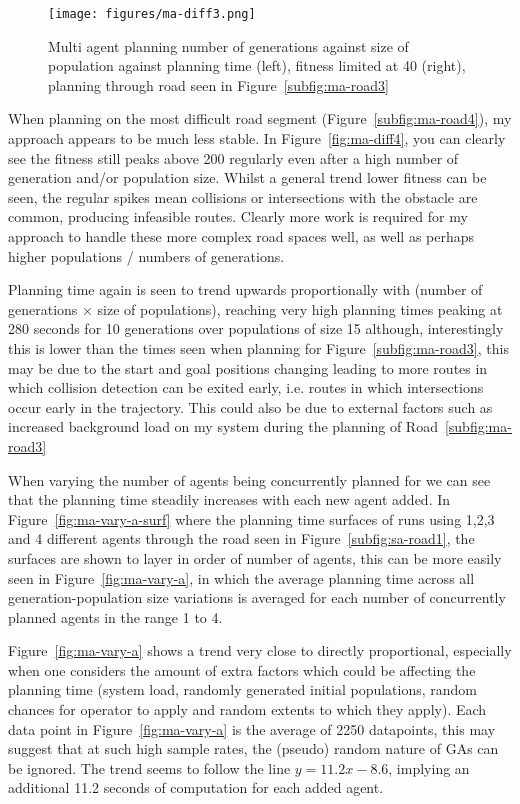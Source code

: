 \begin{figure}[ht]
  \centering
  \texttt{[image: figures/ma-diff3.png]}
  \caption{\label{fig:ma-diff3-lim40} Multi agent planning number of generations against size of population against planning time (left), fitness limited at 40 (right), planning through road seen in Figure~\ref{subfig:ma-road3}}
\end{figure}


When planning on the most difficult road segment (Figure~\ref{subfig:ma-road4}), my approach appears to be much less stable. In Figure~\ref{fig:ma-diff4}, you can clearly see the fitness still peaks above 200 regularly even after a high number of generation and/or population size. Whilst a general trend lower fitness can be seen, the regular spikes mean collisions or intersections with the obstacle are common, producing infeasible routes. Clearly more work is required for my approach to handle these more complex road spaces well, as well as perhaps higher populations / numbers of generations.

Planning time again is seen to trend upwards proportionally with (number of generations $\times$ size of populations), reaching very high planning times peaking at 280 seconds for 10 generations over populations of size 15 although, interestingly this is lower than the times seen when planning for Figure~\ref{subfig:ma-road3}, this may be due to the start and goal positions changing leading to more routes in which collision detection can be exited early, i.e. routes in which intersections occur early in the trajectory. This could also be due to external factors such as increased background load on my system during the planning of Road~\ref{subfig:ma-road3}

When varying the number of agents being concurrently planned for we can see that the planning time steadily increases with each new agent added. In Figure~\ref{fig:ma-vary-a-surf} where the planning time surfaces of runs using 1,2,3 and 4 different agents through the road seen in Figure~\ref{subfig:sa-road1}, the surfaces are shown to layer in order of number of agents, this can be more easily seen in Figure~\ref{fig:ma-vary-a}, in which the average planning time across all generation-population size variations is averaged for each number of concurrently planned agents in the range 1 to 4.

Figure~\ref{fig:ma-vary-a} shows a trend very close to directly proportional, especially when one considers the amount of extra factors which could be affecting the planning time (system load, randomly generated initial populations, random chances for operator to apply and random extents to which they apply). Each data point in Figure~\ref{fig:ma-vary-a} is the average of 2250 datapoints, this may suggest that at such high sample rates, the (pseudo) random nature of GAs can be ignored. The trend seems to follow the line $y = 11.2x - 8.6$, implying an additional 11.2 seconds of computation for each added agent.

